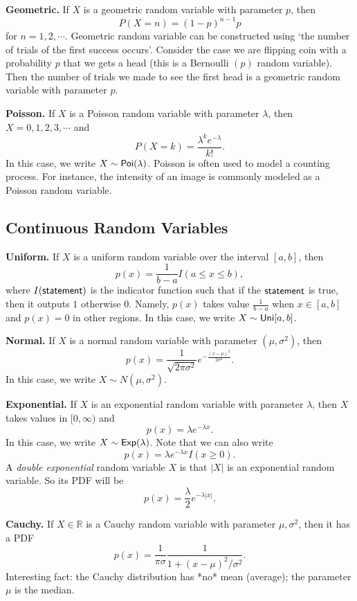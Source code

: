 \documentclass[twoside]{article}
\begin{document}
{\bf Geometric.}
If $X$ is a geometric random variable with parameter $p$, then
$$
P(X=n) = (1-p)^{n-1}p
$$
for $n=1,2,\cdots$. 
Geometric random variable can be constructed using `the number of trials of the first success occurs'. 
Consider the case we are flipping coin with a probability $p$ that we gets a head 
(this is a Bernoulli $(p)$ random variable). 
Then the number of trials we made to see the first head is a geometric random variable with parameter $p$.


{\bf Poisson.}
If $X$ is a Poisson random variable with parameter $\lambda$, then $X =0,1,2,3,\cdots$ and
$$
P(X=k)= \frac{\lambda^ke^{-\lambda}}{k!}. 
$$
In this case, we write $X\sim {\sf Poi}(\lambda)$.
Poisson is often used to model a counting process. 
For instance, the intensity of an image is commonly modeled as a Poisson random variable.

\subsection{Continuous Random Variables}

{\bf Uniform.}
If $X$ is a uniform random variable over the interval $[a,b]$, then
$$
p(x) = \frac{1}{b-a}I(a\leq x \leq b),
$$
where $I({\sf statement})$ is the indicator function such that if the ${\sf statement}$
is true, then it outputs $1$ otherwise $0$.
Namely, $p(x)$ takes value $\frac{1}{b-a}$ when $x\in[a,b]$ and $p(x)=0$ in other regions.
In this case, we write $X\sim {\sf Uni}[a,b]$.


{\bf Normal.}
If $X$ is a normal random variable with parameter $(\mu,\sigma^2)$,
then
$$
p(x) =\frac{1}{\sqrt{2\pi\sigma^2}}e^{-\frac{(x-\mu)^2}{2\sigma^2}}.
$$
In this case, we write $X\sim N(\mu,\sigma^2)$.

{\bf Exponential.}
If $X$ is an exponential random variable with parameter $\lambda$,
then $X$ takes values in $[0,\infty)$ and
$$
p(x) = \lambda e^{-\lambda x}.
$$
In this case, we write $X\sim {\sf Exp}(\lambda)$.
Note that we can also write 
$$
p(x) = \lambda e^{-\lambda x}I(x\geq 0).
$$
A \emph{double exponential} random variable $X$ is that $|X|$ is an exponential random variable. 
So its PDF will be 
$$
p(x) = \frac{\lambda}{2} e^{-\lambda|x|}.
$$



{\bf Cauchy.}
If $X\in\mathbb{R}$ is a Cauchy random variable with parameter $\mu,\sigma^2$,
then it has a PDF
$$
p(x) = \frac{1}{\pi \sigma} \frac{1}{1+(x-\mu)^2/\sigma^2}.
$$
Interesting fact: the Cauchy distribution has *no* mean (average); the parameter $\mu$ is the median.
\end{document}
